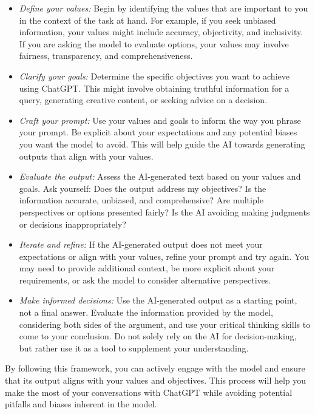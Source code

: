 \documentclass[12pt]{article}
\begin{document}
\begin{itemize}
    \item \textit{Define your values:} Begin by identifying the values that are important to you in the context of the task at hand. For example, if you seek unbiased information, your values might include accuracy, objectivity, and inclusivity. If you are asking the model to evaluate options, your values may involve fairness, transparency, and comprehensiveness.
    \item \textit{Clarify your goals:} Determine the specific objectives you want to achieve using ChatGPT. This might involve obtaining truthful information for a query, generating creative content, or seeking advice on a decision.
    \item \textit{Craft your prompt:} Use your values and goals to inform the way you phrase your prompt. Be explicit about your expectations and any potential biases you want the model to avoid. This will help guide the AI towards generating outputs that align with your values.
    \item \textit{Evaluate the output:} Assess the AI-generated text based on your values and goals. Ask yourself:
        Does the output address my objectives?
        Is the information accurate, unbiased, and comprehensive?
        Are multiple perspectives or options presented fairly?
        Is the AI avoiding making judgments or decisions inappropriately?
    \item \textit{Iterate and refine:} If the AI-generated output does not meet your expectations or align with your values, refine your prompt and try again. You may need to provide additional context, be more explicit about your requirements, or ask the model to consider alternative perspectives.
    \item \textit{Make informed decisions:} Use the AI-generated output as a starting point, not a final answer. Evaluate the information provided by the model, considering both sides of the argument, and use your critical thinking skills to come to your conclusion. Do not solely rely on the AI for decision-making, but rather use it as a tool to supplement your understanding.
\end{itemize}

By following this framework, you can actively engage with the model and ensure that its output aligns with your values and objectives. This process will help you make the most of your conversations with ChatGPT while avoiding potential pitfalls and biases inherent in the model.
\end{document}
